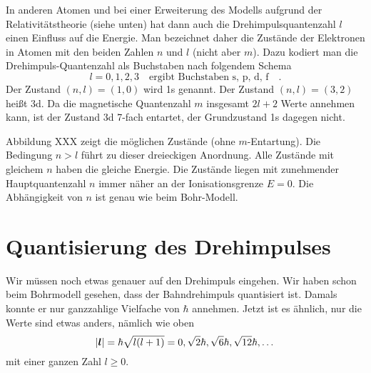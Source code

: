 In anderen Atomen und bei einer Erweiterung des Modells aufgrund der Relativitätstheorie (siehe unten) hat dann auch die Drehimpulsquantenzahl $l$ einen Einfluss auf die Energie. Man bezeichnet daher die Zustände der Elektronen in Atomen mit den beiden Zahlen $n$ und $l$ (nicht aber $m$). Dazu kodiert man die Drehimpuls-Quantenzahl als Buchstaben nach folgendem Schema
\begin{equation}
    l = 0, 1, 2, 3 \quad \text{ergibt Buchstaben \ \ s, p, d, f} \quad .
\end{equation}
Der Zustand $(n,l) = (1,0)$ wird 1s genannt. Der Zustand $(n,l) = (3,2)$ heißt 3d. Da die magnetische Quantenzahl $m$ insgesamt $2l+2$ Werte annehmen kann, ist der Zustand 3d 7-fach entartet, der Grundzustand 1s dagegen nicht.



Abbildung XXX zeigt die möglichen Zustände (ohne $m$-Entartung). Die Bedingung $n > l$ führt zu dieser dreieckigen Anordnung. Alle Zustände mit gleichem $n$ haben die gleiche Energie. Die Zustände liegen mit zunehmender Hauptquantenzahl $n$ immer näher an der Ionisationsgrenze $E=0$. Die Abhängigkeit von $n$ ist genau wie beim Bohr-Modell.


\section{Quantisierung des Drehimpulses}

Wir müssen noch etwas genauer auf den Drehimpuls eingehen. Wir haben schon beim Bohrmodell gesehen, dass der Bahndrehimpuls quantisiert ist. Damals konnte er nur ganzzahlige Vielfache von $\hbar$ annehmen. Jetzt ist es ähnlich, nur die Werte sind etwas anders, nämlich wie oben
\begin{equation}
    |\boldsymbol{l}| = \hbar \sqrt{l (l+1) } = 0, \sqrt{2} \hbar, \sqrt{6} \hbar, \sqrt{12} \hbar, \dots
\end{equation}
mit einer ganzen Zahl $l \ge 0$.

